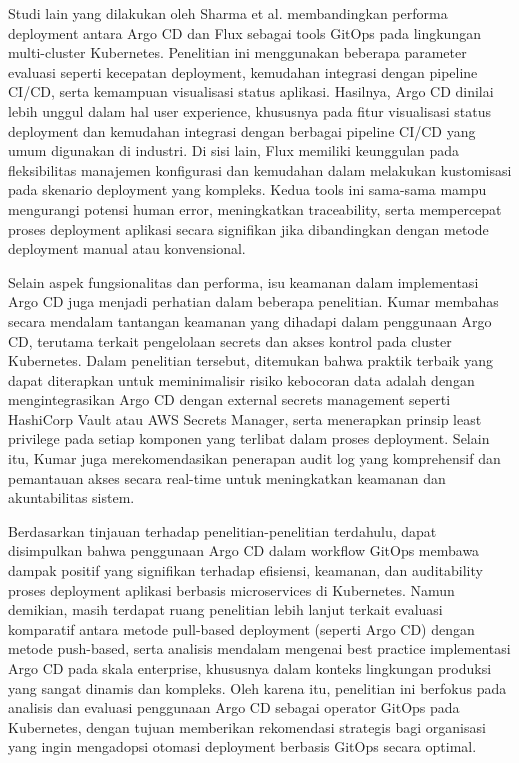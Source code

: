 Studi lain yang dilakukan oleh Sharma et al. \cite{Sharma2022} membandingkan performa deployment antara Argo CD dan Flux sebagai tools GitOps pada lingkungan multi-cluster Kubernetes.
Penelitian ini menggunakan beberapa parameter evaluasi seperti kecepatan deployment, kemudahan integrasi dengan pipeline CI/CD, serta kemampuan visualisasi status aplikasi.
Hasilnya, Argo CD dinilai lebih unggul dalam hal user experience, khususnya pada fitur visualisasi status deployment dan kemudahan integrasi dengan berbagai pipeline CI/CD yang umum digunakan di industri.
Di sisi lain, Flux memiliki keunggulan pada fleksibilitas manajemen konfigurasi dan kemudahan dalam melakukan kustomisasi pada skenario deployment yang kompleks.
Kedua tools ini sama-sama mampu mengurangi potensi human error, meningkatkan traceability, serta mempercepat proses deployment aplikasi secara signifikan jika dibandingkan dengan metode deployment manual atau konvensional.

Selain aspek fungsionalitas dan performa,
isu keamanan dalam implementasi Argo CD juga menjadi perhatian dalam beberapa penelitian.
Kumar \cite{Kumar2023} membahas secara mendalam tantangan keamanan yang dihadapi dalam penggunaan Argo CD,
terutama terkait pengelolaan secrets dan akses kontrol pada cluster Kubernetes. Dalam penelitian tersebut,
ditemukan bahwa praktik terbaik yang dapat diterapkan untuk meminimalisir risiko kebocoran data adalah dengan mengintegrasikan
Argo CD dengan external secrets management seperti HashiCorp Vault atau AWS Secrets Manager, serta menerapkan prinsip least privilege
pada setiap komponen yang terlibat dalam proses deployment. Selain itu, Kumar juga merekomendasikan penerapan audit log yang komprehensif
dan pemantauan akses secara real-time untuk meningkatkan keamanan dan akuntabilitas sistem.

Berdasarkan tinjauan terhadap penelitian-penelitian terdahulu, dapat disimpulkan bahwa penggunaan Argo CD dalam workflow GitOps membawa dampak positif yang signifikan terhadap efisiensi, keamanan, dan auditability proses deployment aplikasi berbasis microservices di Kubernetes. Namun demikian, masih terdapat ruang penelitian lebih lanjut terkait evaluasi komparatif antara metode pull-based deployment (seperti Argo CD) dengan metode push-based, serta analisis mendalam mengenai best practice implementasi Argo CD pada skala enterprise, khususnya dalam konteks lingkungan produksi yang sangat dinamis dan kompleks. Oleh karena itu, penelitian ini berfokus pada analisis dan evaluasi penggunaan Argo CD sebagai operator GitOps pada Kubernetes, dengan tujuan memberikan rekomendasi strategis bagi organisasi yang ingin mengadopsi otomasi deployment berbasis GitOps secara optimal.
\newpage
